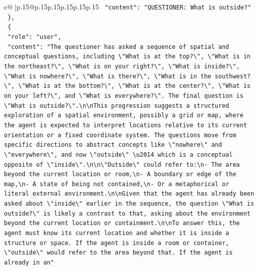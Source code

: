 \documentclass{article}
\begin{document}
{\begin{supertabular}{c@{$\;$}|p{.15\linewidth}@{}p{.15\linewidth}p{.15\linewidth}p{.15\linewidth}p{.15\linewidth}p{.15\linewidth}}
{{{\texttt{    "content": "QUESTIONER: What is outside?"} \\
\texttt{  \},} \\
\texttt{  \{} \\
\texttt{    "role": "user",} \\
\texttt{    "content": "The questioner has asked a sequence of spatial and conceptual questions, including \textbackslash{}"What is at the top?\textbackslash{}", \textbackslash{}"What is in the northeast?\textbackslash{}", \textbackslash{}"What is on your right?\textbackslash{}", \textbackslash{}"What is inside?\textbackslash{}", \textbackslash{}"What is nowhere?\textbackslash{}", \textbackslash{}"What is there?\textbackslash{}", \textbackslash{}"What is in the southwest?\textbackslash{}", \textbackslash{}"What is at the bottom?\textbackslash{}", \textbackslash{}"What is at the center?\textbackslash{}", \textbackslash{}"What is on your left?\textbackslash{}", and \textbackslash{}"What is everywhere?\textbackslash{}". The final question is \textbackslash{}"What is outside?\textbackslash{}".\textbackslash{}n\textbackslash{}nThis progression suggests a structured exploration of a spatial environment, possibly a grid or map, where the agent is expected to interpret locations relative to its current orientation or a fixed coordinate system. The questions move from specific directions to abstract concepts like \textbackslash{}"nowhere\textbackslash{}" and \textbackslash{}"everywhere\textbackslash{}", and now \textbackslash{}"outside\textbackslash{}" \textbackslash{}u2014 which is a conceptual opposite of \textbackslash{}"inside\textbackslash{}".\textbackslash{}n\textbackslash{}n\textbackslash{}"Outside\textbackslash{}" could refer to:\textbackslash{}n{-} The area beyond the current location or room,\textbackslash{}n{-} A boundary or edge of the map,\textbackslash{}n{-} A state of being not contained,\textbackslash{}n{-} Or a metaphorical or literal external environment.\textbackslash{}n\textbackslash{}nGiven that the agent has already been asked about \textbackslash{}"inside\textbackslash{}" earlier in the sequence, the question \textbackslash{}"What is outside?\textbackslash{}" is likely a contrast to that, asking about the environment beyond the current location or containment.\textbackslash{}n\textbackslash{}nTo answer this, the agent must know its current location and whether it is inside a structure or space. If the agent is inside a room or container, \textbackslash{}"outside\textbackslash{}" would refer to the area beyond that. If the agent is already in an"} \\
}}}
\end{supertabular}}
\end{document}
